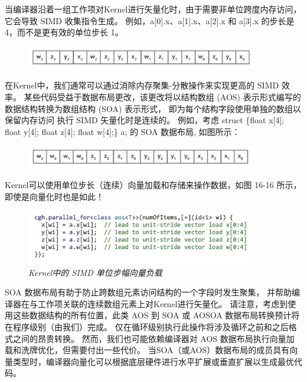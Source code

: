 当编译器沿着一组工作项对Kernel进行矢量化时，由于需要非单位跨度内存访问，它会导致 SIMD 收集指令生成。 
例如，a[0].x、a[1].x、a[2].x 和 a[3].x 的步长是 4，而不是更有效的单位步长 1。

\begin{figure}[!htbp]
	\centering
	\includegraphics[width=0.9\textwidth]{figs/F16-a1.png}
\end{figure}

在Kernel中，我们通常可以通过消除内存聚集-分散操作来实现更高的 SIMD 效率。 
某些代码受益于数据布局更改，该更改将以结构数组 (AOS) 表示形式编写的数据结构转换为数组结构 (SOA) 表示形式，
即为每个结构字段使用单独的数组以保留内存访问 执行 SIMD 矢量化时是连续的。 
例如，考虑 struct \{float x[4]; float y[4]; float z[4]; float w[4];\} a; 的 SOA 数据布局, 如图所示：

\begin{figure}[!htbp]
	\centering
	\includegraphics[width=0.9\textwidth]{figs/F16-a2.png}
\end{figure}

Kernel可以使用单位步长（连续）向量加载和存储来操作数据，如图 16-16 所示，即使是向量化时也是如此！

\begin{figure}[H]
	\centering
	\includegraphics[width=0.9\textwidth]{figs/F16.16.png}
	\caption{\textit{Kernel中的 SIMD 单位步幅向量负载 }}
\end{figure}

SOA 数据布局有助于防止跨数组元素访问结构的一个字段时发生聚集，
并帮助编译器在与工作项关联的连续数组元素上对Kernel进行矢量化。 
请注意，考虑到使用这些数据结构的所有位置，此类 AOS 到 SOA 或 AOSOA 数据布局转换预计将在程序级别（由我们）完成。 
仅在循环级别执行此操作将涉及循环之前和之后格式之间的昂贵转换。 
然而，我们也可能依赖编译器对 AOS 数据布局执行向量加载和洗牌优化，但需要付出一些代价。 
当SOA（或AOS）数据布局的成员具有向量类型时，编译器向量化可以根据底层硬件进行水平扩展或垂直扩展以生成最优代码。


